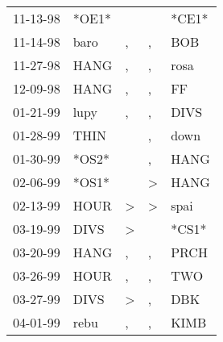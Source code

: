 \begin{supertabular}{p{0.07\textwidth}p{0.06\textwidth}p{0.02\textwidth}p{0.02\textwidth}p{0.06\textwidth}}
          11-13-98\textsuperscript{} &                            *OE1* &                  &                  &                            *CE1* \\
          11-14-98\textsuperscript{} &           baro\textsuperscript{} &                , &                , &            BOB\textsuperscript{} \\
          11-27-98\textsuperscript{} &           HANG\textsuperscript{} &                , &                , &           rosa\textsuperscript{} \\
          12-09-98\textsuperscript{} &           HANG\textsuperscript{} &                , &                , &             FF\textsuperscript{} \\
          01-21-99\textsuperscript{} &           lupy\textsuperscript{} &                , &                , &           DIVS\textsuperscript{} \\
          01-28-99\textsuperscript{} &           THIN\textsuperscript{} &                  &                , &           down\textsuperscript{} \\
          01-30-99\textsuperscript{} &                            *OS2* &                  &                , &           HANG\textsuperscript{} \\
          02-06-99\textsuperscript{} &                            *OS1* &                  &     \textgreater &           HANG\textsuperscript{} \\
          02-13-99\textsuperscript{} &           HOUR\textsuperscript{} &     \textgreater &     \textgreater &           spai\textsuperscript{} \\
          03-19-99\textsuperscript{} &           DIVS\textsuperscript{} &     \textgreater &                  &                            *CS1* \\
          03-20-99\textsuperscript{} &           HANG\textsuperscript{} &                , &                , &           PRCH\textsuperscript{} \\
          03-26-99\textsuperscript{} &           HOUR\textsuperscript{} &                , &                , &            TWO\textsuperscript{} \\
          03-27-99\textsuperscript{} &           DIVS\textsuperscript{} &     \textgreater &                , &            DBK\textsuperscript{} \\
          04-01-99\textsuperscript{} &           rebu\textsuperscript{} &                , &                , &           KIMB\textsuperscript{} \\

\end{supertabular}
